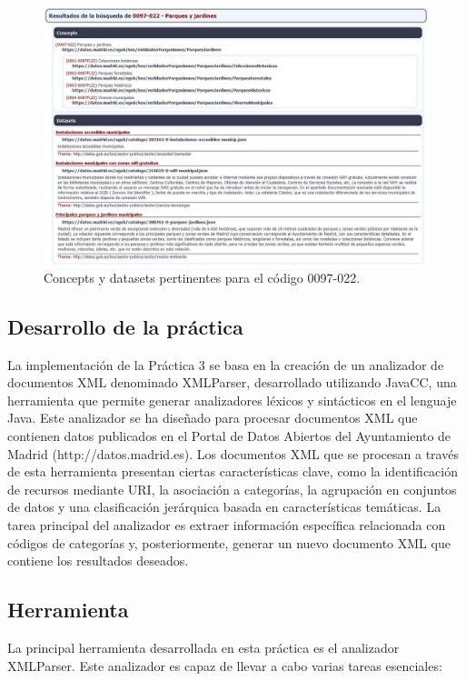 \begin{figure}[H]
    \centering
    \includegraphics[width=\textwidth]{imagenes/Practica3fig2.jpg}
    \caption{Concepts y datasets pertinentes para el código 0097-022.}
    \label{fig:Practica3fig2.jpg}
\end{figure}

\subsection{Desarrollo de la práctica}

\noindent La implementación de la Práctica 3 se basa en la creación de un analizador de documentos XML denominado XMLParser, desarrollado utilizando JavaCC, una herramienta que permite generar analizadores léxicos y sintácticos en el lenguaje Java. Este analizador se ha diseñado para procesar documentos XML que contienen datos publicados en el Portal de Datos Abiertos del Ayuntamiento de Madrid (http://datos.madrid.es).
Los documentos XML que se procesan a través de esta herramienta presentan ciertas características clave, como la identificación de recursos mediante URI, la asociación a categorías, la agrupación en conjuntos de datos y una clasificación jerárquica basada en características temáticas. La tarea principal del analizador es extraer información específica relacionada con códigos de categorías y, posteriormente, generar un nuevo documento XML que contiene los resultados deseados.

\subsection{Herramienta}
\noindent La principal herramienta desarrollada en esta práctica es el analizador XMLParser. Este analizador es capaz de llevar a cabo varias tareas esenciales:

